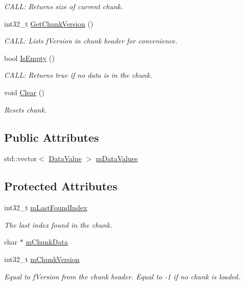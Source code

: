 \begin{DoxyCompactItemize}
\begin{DoxyCompactList}\small\item\em C\+A\+LL\+: Returns size of current chunk. \end{DoxyCompactList}\item 
int32\+\_\+t \mbox{\hyperlink{a01461_a8203d58398537e3d254b43f9d321af4c}{Get\+Chunk\+Version}} ()
\begin{DoxyCompactList}\small\item\em C\+A\+LL\+: Lists f\+Version in chunk header for convenience. \end{DoxyCompactList}\item 
bool \mbox{\hyperlink{a01461_a88ab0773d25dad48ab6c693662243f47}{Is\+Empty}} ()
\begin{DoxyCompactList}\small\item\em C\+A\+LL\+: Returns true if no data is in the chunk. \end{DoxyCompactList}\item 
void \mbox{\hyperlink{a01461_a5718452d41c2292ba338b23ffc6cf29b}{Clear}} ()
\begin{DoxyCompactList}\small\item\em Resets chunk. \end{DoxyCompactList}\end{DoxyCompactItemize}
\subsection*{Public Attributes}
\begin{DoxyCompactItemize}
\item 
std\+::vector$<$ \mbox{\hyperlink{a01465}{Data\+Value}} $>$ \mbox{\hyperlink{a01461_af3963982859b42ddebdcaeba36dd1d29}{m\+Data\+Values}}
\end{DoxyCompactItemize}
\subsection*{Protected Attributes}
\begin{DoxyCompactItemize}
\item 
int32\+\_\+t \mbox{\hyperlink{a01461_a3e08508e7f92c6e43dd2de6a38868e2f}{m\+Last\+Found\+Index}}
\begin{DoxyCompactList}\small\item\em The last index found in the chunk. \end{DoxyCompactList}\item 
char $\ast$ \mbox{\hyperlink{a01461_a67054cdc2d8e55ff2c26947930784bc9}{m\+Chunk\+Data}}
\item 
int32\+\_\+t \mbox{\hyperlink{a01461_a5994e0adfb0189cbf5f9a3aa915b3f7d}{m\+Chunk\+Version}}
\begin{DoxyCompactList}\small\item\em Equal to f\+Version from the chunk header. Equal to -\/1 if no chunk is loaded. \end{DoxyCompactList}\end{DoxyCompactItemize}
